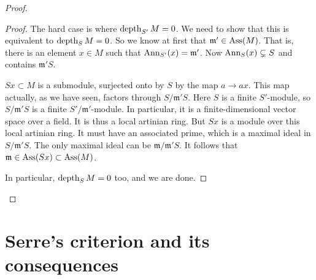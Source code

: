 \begin{example}
\begin{proof}
\begin{proof}
The hard case is where $\operatorname{depth}_{S'} M = 0$. We need to show that
this is
equivalent to $\operatorname{depth}_{S} M = 0$. So we know at first that
$\mathfrak{m}' \in
\operatorname{Ass}(M)$. That is, there is an element $x \in M$ such that
$\operatorname{Ann}_{S'}(x) =
\mathfrak{m}'$.
Now $\operatorname{Ann}_S(x) \subsetneq S$ and contains $\mathfrak{m}' S$.

$Sx \subset M$ is a submodule, surjected onto by $S$ by the map
$a \to ax$.
This map actually, as we have seen, factors through
$S/\mathfrak{m}' S$. Here
$S$ is a finite $S'$-module, so $S/\mathfrak{m}'S$ is a finite
$S'/\mathfrak{m}'$-module. In particular, it is a
finite-dimensional vector space
over a field. It is thus a local artinian ring. But $Sx$ is a
module over this
local artinian ring. It must have an associated prime, which is
a maximal
ideal in $S/\mathfrak{m}'S$. The only maximal ideal can be
$\mathfrak{m}/\mathfrak{m}'S$. It follows that $\mathfrak{m}
\in\operatorname{Ass}(Sx)
\subset \operatorname{Ass}(M)$.

In particular, $\operatorname{depth}_S M = 0$ too, and we are done.
\end{proof}

\end{proof}
\end{example}

\begin{comment}We shall eventually prove:

\begin{proposition}
Let $R = \mathbb{C}[X_1, \dots, X_n]/\mathfrak{p}$ for
$\mathfrak{p}$ prime.
Choose an injective map $\mathbb{C}[y_1, \dots, y_n]
\hookrightarrow R$ making $R$ a
finite module. Then $R$ is Cohen-Macaulay iff $R$ is projective
as a module
over $\mathbb{C}[y_1, \dots, y_n]$.\footnote{In fact, this is
equivalent to
freeness, although we will not prove it. Any projective finite
module over a
polynomial ring over a field is free, though this is a hard
theorem.}
\end{proposition}

The picture is that the inclusion $\mathbb{C}[y_1, \dots, y_m ]
\hookrightarrow
\mathbb{C}[x_1, \dots, x_n]/\mathfrak{p}$ corresponds to a map
\[ X \to \mathbb{C}^m  \]
for $X = V(\mathfrak{p}) \subset \mathbb{C}^n$. This statement
of freeness is a
statement about how the fibers of this finite map stay similar
in some sense.

\end{proof}
\end{comment}

\section{Serre's criterion and its consequences}


